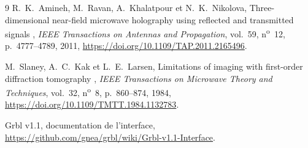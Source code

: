 \documentclass[11pt,a4paper]{article}
\begin{document}
\begin{thebibliography}{9}
R.~K.~Amineh, M.~Ravan, A.~Khalatpour et N.~K.~Nikolova,
\og Three-dimensional near-field microwave holography using reflected and
transmitted signals \fg{}, \emph{IEEE Transactions on Antennas and
Propagation}, vol.~59, n\textsuperscript{o}~12, p.~4777--4789, 2011,
\url{https://doi.org/10.1109/TAP.2011.2165496}.

M.~Slaney, A.~C.~Kak et L.~E.~Larsen, \og Limitations of imaging with
first-order diffraction tomography \fg{}, \emph{IEEE Transactions on Microwave
Theory and Techniques}, vol.~32, n\textsuperscript{o}~8, p.~860--874, 1984,
\url{https://doi.org/10.1109/TMTT.1984.1132783}.

Grbl v1.1, documentation de l'interface,
\url{https://github.com/gnea/grbl/wiki/Grbl-v1.1-Interface}.
\end{thebibliography}
\end{document}
